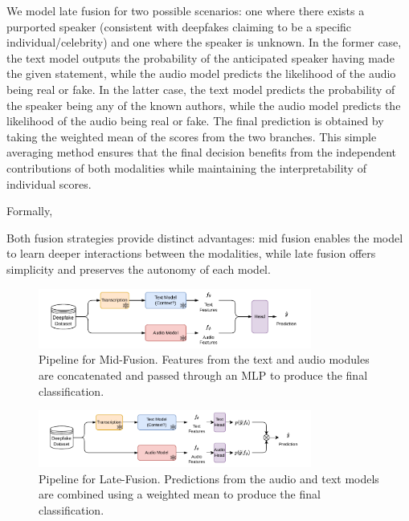 \documentclass{Interspeech}
\begin{document}

We model late fusion for two possible scenarios: one where there exists a
purported speaker (consistent with deepfakes claiming to be a specific
individual/celebrity) and one where the speaker is unknown. In the former case,
the text model outputs the probability of the anticipated speaker having made
the given statement, while the audio model predicts the likelihood of the audio
being real or fake. In the latter case, the text model predicts the probability
of the speaker being any of the known authors, while the audio model predicts
the likelihood of the audio being real or fake. The final prediction is
obtained by taking the weighted mean of the scores from the two branches. This
simple averaging method ensures that the final decision benefits from the
independent contributions of both modalities while maintaining the
interpretability of individual scores.

Formally, 

Both fusion strategies provide distinct advantages: mid fusion enables the
model to learn deeper interactions between the modalities, while late fusion
offers simplicity and preserves the autonomy of each model.

\begin{figure}[t]
  \centering
  \includegraphics[width=0.8\textwidth]{figures/mid_fusion.pdf}
  \caption{Pipeline for Mid-Fusion. Features from the text and audio modules are concatenated and passed through an MLP to produce the final classification.}\label{fig:mid_fusion}
\end{figure}

\begin{figure}[t]
  \centering
  \includegraphics[width=0.8\textwidth]{figures/late_fusion.pdf}
  \caption{Pipeline for Late-Fusion. Predictions from the audio and text models are combined using a weighted mean to produce the final classification.}\label{fig:late_fusion} 
\end{figure}
\end{document}

